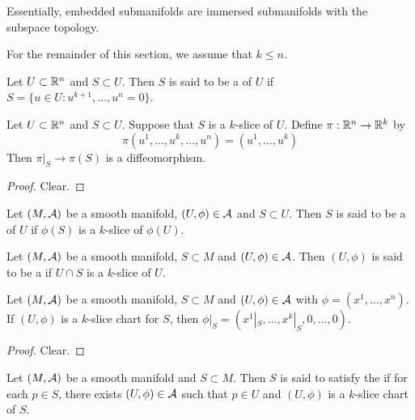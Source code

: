 \documentclass{book}
\begin{document}
	\begin{note}
	Essentially, embedded submanifolds are immersed submanifolds with the subspace topology.
	\end{note}
	
	\begin{note}
	For the remainder of this section, we assume that $k \leq n$.
	\end{note}
	
	\begin{defn}
	Let $U \subset \mathbb{R}^n$ and $S \subset U$. Then $S$ is said to be a  of $U$ if $S = \{u \in U: u^{k+1}, \dots, u^{n} = 0\}$.
	\end{defn}	
	
	\begin{ex}
	Let $U \subset \mathbb{R}^n$ and $S \subset U$. Suppose that $S$ is a $k$-slice of $U$. Define $\pi: \mathbb{R}^n \rightarrow \mathbb{R}^k$ by $$\pi(u^1, \dots, u^k, \dots, u^n) = (u^1, \dots, u^k)$$ Then $\pi|_{S} \rightarrow \pi(S)$ is a diffeomorphism.
	\end{ex}	
	
	\begin{proof}
	Clear.
	\end{proof}
	
	\begin{defn}
	Let $(M, \mathcal{A})$ be a smooth manifold, $(U, \phi) \in \mathcal{A}$ and $S \subset U$. Then $S$ is said to be a  of $U$ if $\phi(S)$ is a $k$-slice of $\phi(U)$.
	\end{defn}	
	
	\begin{defn}
	Let $(M, \mathcal{A})$ be a smooth manifold, $S \subset M$ and $(U, \phi) \in \mathcal{A}$. Then $(U, \phi)$ is said to be a  if $U \cap S$ is a $k$-slice of $U$.
	\end{defn}	
	
	\begin{ex}
	Let $(M, \mathcal{A})$ be a smooth manifold, $S \subset M$ and $(U, \phi) \in \mathcal{A}$ with $\phi = (x^1, \dots, x^n)$. If $(U, \phi)$ is a $k$-slice chart for $S$, then $\phi|_S = (x^1|_S, \dots, x^k|_S, 0, \dots, 0)$.
	\end{ex}
	
	\begin{proof}
	Clear. 
	\end{proof}
	
	\begin{defn}
	Let $(M, \mathcal{A})$ be a smooth manifold and $S \subset M$. Then $S$ is said to satisfy the  if for each $p \in S$, there exists $(U, \phi) \in \mathcal{A}$ such that $p \in U$ and $(U, \phi)$ is a $k$-slice chart of $S$.
	\end{defn}
	
\end{document}
